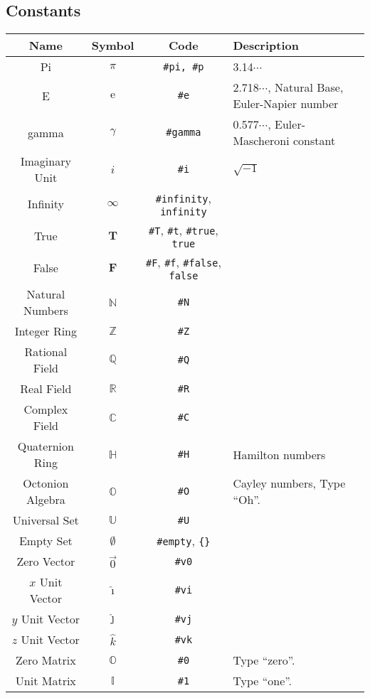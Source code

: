 \documentclass{article}
\begin{document}
  \subsection{Constants} %
  \label{sub:constants}
  \begin{table}[!h]
    \centering
    \begin{tabular}{|c|c|c|l|}
      \hline
      \textbf{Name} & \textbf{Symbol} & \textbf{Code} & \textbf{Description} \\
      \hline\hline
      Pi & \( \pi \) & \texttt{\#pi, \#p} & 3.14\(\cdots\)\\
      E & \( \mathrm{e} \) & \texttt{\#e} & 2.718\(\cdots\), Natural Base, Euler-Napier number \\
      gamma & \( \gamma \) & \texttt{\#gamma} & 0.577\(\cdots\), Euler-Mascheroni constant\\
      Imaginary Unit & \( i \) & \texttt{\#i} & \( \sqrt{-1} \) \\
      Infinity & \( \infty \) & \texttt{\#infinity}, \texttt{infinity} & \\
      \hline
      True & \( \mathbf{T} \) & \texttt{\#T}, \texttt{\#t}, \texttt{\#true}, \texttt{true} & \\
      False & \( \mathbf{F} \) & \texttt{\#F}, \texttt{\#f}, \texttt{\#false}, \texttt{false} & \\
      \hline
      Natural Numbers & \( \mathbb{N} \) & \texttt{\#N} & \\
      Integer Ring & \( \mathbb{Z} \) & \texttt{\#Z} & \\
      Rational Field & \( \mathbb{Q} \) & \texttt{\#Q} & \\
      Real Field & \( \mathbb{R} \) & \texttt{\#R} & \\
      Complex Field & \( \mathbb{C} \) & \texttt{\#C} & \\
      Quaternion Ring & \( \mathbb{H} \) & \texttt{\#H} & Hamilton numbers\\
      Octonion Algebra & \( \mathbb{O} \) & \texttt{\#O} & Cayley numbers, Type ``Oh''.\\
      \hline
      Universal Set & \( \mathbb{U} \) & \texttt{\#U} & \\
      Empty Set & \( \emptyset \) & \texttt{\#empty}, \texttt{\{\}} & \\
      \hline
      Zero Vector & \( \vec0 \) & \texttt{\#v0} & \\
      \( x \) Unit Vector & \( \hat\imath \) & \texttt{\#vi} & \\
      \( y \) Unit Vector & \( \hat\jmath \) & \texttt{\#vj} & \\
      \( z \) Unit Vector & \( \hat{k} \) & \texttt{\#vk} & \\
      \hline
      Zero Matrix & \( \mathbb{O} \) & \texttt{\#0} & Type ``zero''.\\
      Unit Matrix & \( \mathbb{I} \) & \texttt{\#1} & Type ``one''.\\
      \hline
    \end{tabular}
  \end{table}
\end{document}
